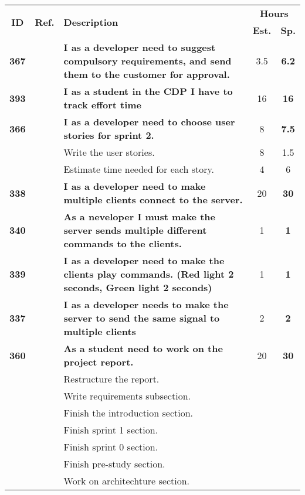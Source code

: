   \label{tab:sprint2stories}
 \def\arraystretch{1.25}
 
\begin{longtable}{ccXcc}
\toprule[1mm]
\multirow{2}{*}{\textbf{ID}} &
\multirow{2}{*}{\textbf{Ref.}} & \multirow{2}{*}{\textbf{Description}} & \multicolumn{2}{c}{\textbf{Hours}} \\
 				& & & \textbf{Est.} & \textbf{Sp.} \\ 				
\midrule

	
\textbf{367} 	& {M6}
	& {\bf I as a developer need to suggest compulsory requirements, and send them to the customer for approval.} 	& 		3.5	& \textbf{6.2} \\

\textbf{393} 	& {C1}
	& {\bf  I as a student in the CDP I have to track effort time} 	& 		16	& \textbf{16} \\

\textbf{366} 	& {M6}
	& {\bf I as a developer need to choose user stories for sprint 2. } 	& 	8	& \textbf{7.5} \\
				&& Write the user stories. 	& 8 &  1.5 \\
				&& Estimate time needed for each story. 	&  4 & 6 \\	

\textbf{338} 	& {M6}
	& {\bf I as a developer need to make multiple clients connect to the server.} 	& 	20		& \textbf{30} \\


\textbf{340} 	& {M6}
	& {\bf As a neveloper I must make the server sends multiple different commands to the clients. } 	& 		1	& \textbf{1} \\

\textbf{339} 	& {M3}
	& {\bf  I as a developer need to make the clients play commands. (Red light 2 seconds, Green light 2 seconds)} 	& 		1	& \textbf{1} \\

\textbf{337} 	& {M3}
	& {\bf  I as a developer needs to make the server to send the same signal to multiple clients} 	& 		2	& \textbf{2} \\
		
\midrule
\textbf{360} 	& {M6}
	& {\bf As a student need to work on the project report.} 	& 	20	& \textbf{ 30} \\
				&& Restructure the report.	&  &  \\
				&& Write requirements subsection.	&  &  \\
				&& Finish the introduction section.	&  & \\
				&& Finish sprint 1 section.	&  &  \\
				&& Finish sprint 0 section.	&  &  \\
				&& Finish pre-study section.	&  &  \\
				&& Work on architechture section.	&  &  \\


\end{longtable}

